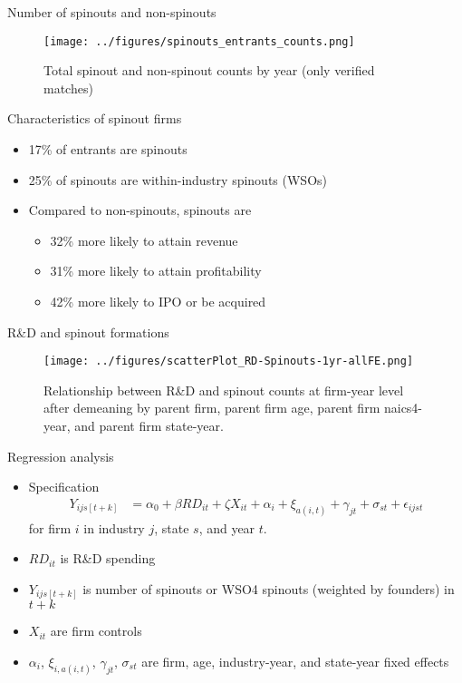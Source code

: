 \documentclass[english,usenames,dvipsnames]{beamer}
\begin{document}
\begin{frame}{Number of spinouts and non-spinouts}
\begin{figure}
\texttt{[image: ../figures/spinouts\_entrants\_counts.png]}
\caption{\footnotesize Total spinout and non-spinout counts by year (only verified matches)}
\end{figure}
\end{frame}

\begin{frame}{Characteristics of spinout firms}
\begin{itemize}
	\item 17\% of entrants are spinouts
	\item 25\% of spinouts are within-industry spinouts (WSOs)
	\item Compared to non-spinouts, spinouts are
	\begin{itemize}
		\item 32\% more likely to attain revenue
		\item 31\% more likely to attain profitability
		\item 42\% more likely to IPO or be acquired
	\end{itemize}
\end{itemize}
\end{frame}


\begin{frame}{R\&D and spinout formations}
\begin{figure}
	\texttt{[image: ../figures/scatterPlot\_RD-Spinouts-1yr-allFE.png]}
	\caption{Relationship between R\&D and spinout counts at firm-year level after demeaning by parent firm, parent firm age, parent firm naics4-year, and parent firm state-year.}
\end{figure}
\end{frame}


\begin{frame}{Regression analysis}
\begin{itemize}
\item Specification
\begin{align*}
Y_{ijs[t+k]} &= \alpha_0 + \beta RD_{it} + \zeta X_{it} + \alpha_i + \xi_{a(i,t)} +  \gamma_{jt} + \sigma_{st} + \epsilon_{ijst}
\end{align*}
for firm $i$ in industry $j$, state $s$, and year $t$.
\item $RD_{it}$ is R\&D spending
\item $Y_{ijs[t+k]}$ is number of spinouts or WSO4 spinouts (weighted by founders) in $t+k$
\item $X_{it}$ are firm controls
\item $\alpha_i$, $\xi_{i,a(i,t)}$, $\gamma_{jt}$, $\sigma_{st}$ are firm, age, industry-year, and state-year fixed effects
\end{itemize}
\end{frame}
\end{document}
